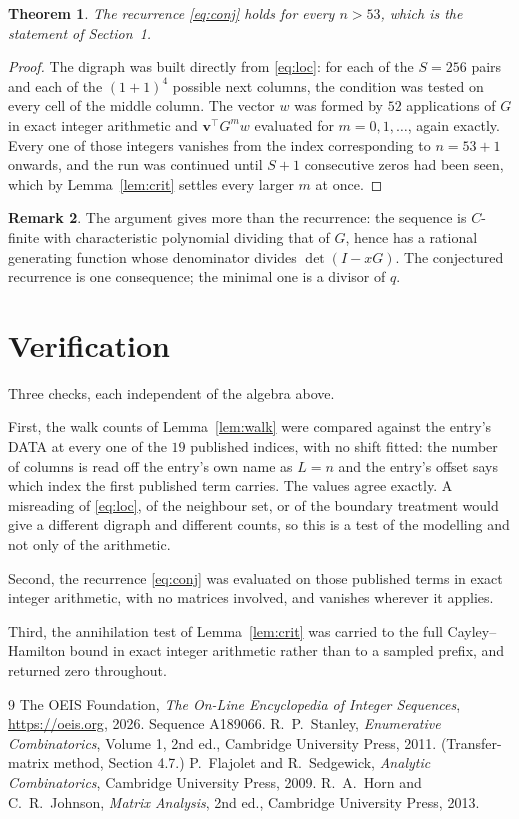\documentclass[11pt,a4paper]{article}
\theoremstyle{plain}
\newtheorem{theorem}{Theorem}
\theoremstyle{definition}
\newtheorem{remark}[theorem]{Remark}
\begin{document}
\begin{theorem}
The recurrence \eqref{eq:conj} holds for every $n>53$, which is the statement of
Section~1.
\end{theorem}

\begin{proof}
The digraph was built directly from \eqref{eq:loc}: for each of the $S=256$ pairs and each
of the $(1+1)^{4}$ possible next columns, the condition was tested on every cell of
the middle column. The vector $w$ was formed by $52$ applications of $G$ in exact integer
arithmetic and $\mathbf{v}^{\!\top}G^{m}w$ evaluated for $m=0,1,\dots$, again exactly.
Every one of those integers vanishes from the index corresponding to $n=53+1$ onwards,
and the run was continued until $S+1$ consecutive zeros had been seen, which by
Lemma~\ref{lem:crit} settles every larger $m$ at once.
\end{proof}

\begin{remark}
The argument gives more than the recurrence: the sequence is $C$-finite with characteristic
polynomial dividing that of $G$, hence has a rational generating function whose denominator
divides $\det(I-xG)$. The conjectured recurrence is one consequence; the minimal one is a
divisor of $q$.
\end{remark}

\section{Verification}

Three checks, each independent of the algebra above.

First, the walk counts of Lemma~\ref{lem:walk} were compared against the entry's DATA at
every one of the $19$ published indices, with no shift fitted: the number of columns is
read off the entry's own name as $L=n$ and the entry's offset says which index the first
published term carries. The values agree exactly. A misreading of \eqref{eq:loc}, of the
neighbour set, or of the boundary treatment would give a different digraph and different
counts, so this is a test of the modelling and not only of the arithmetic.

Second, the recurrence \eqref{eq:conj} was evaluated on those published terms in exact
integer arithmetic, with no matrices involved, and vanishes wherever it applies.

Third, the annihilation test of Lemma~\ref{lem:crit} was carried to the full
Cayley--Hamilton bound in exact integer arithmetic rather than to a sampled prefix, and
returned zero throughout.

\begin{thebibliography}{9}
 The OEIS Foundation, \emph{The On-Line Encyclopedia of Integer
Sequences}, \url{https://oeis.org}, 2026. Sequence A189066.
 R.~P.~Stanley, \emph{Enumerative Combinatorics}, Volume 1, 2nd ed.,
Cambridge University Press, 2011. (Transfer-matrix method, Section 4.7.)
 P.~Flajolet and R.~Sedgewick, \emph{Analytic Combinatorics}, Cambridge
University Press, 2009.
 R.~A.~Horn and C.~R.~Johnson, \emph{Matrix Analysis}, 2nd ed., Cambridge
University Press, 2013.
\end{thebibliography}
\end{document}
